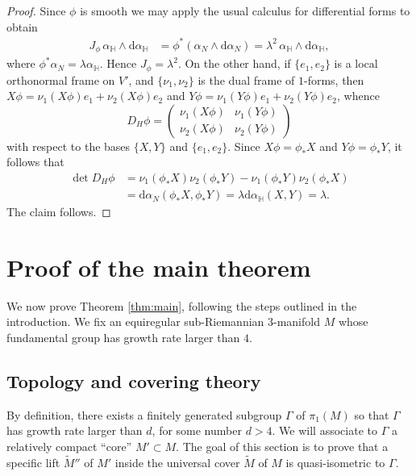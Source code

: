 \documentclass[10pt,letterpaper]{amsart}
\theoremstyle{definition}
\numberwithin{thm}{subsection}
\numberwithin{equation}{section}
\begin{document}
\begin{proof}
Since $\phi$ is smooth we may apply the usual calculus for differential forms to obtain
\begin{align*}
J_{\phi} \, \alpha_{\mathbb H}\wedge \mathrm{d}\alpha_{\mathbb H}&=
\phi^{\ast} (\alpha_N \wedge \mathrm{d}\alpha_N)= \lambda^2 \,
\alpha_{\mathbb H}\wedge \mathrm{d}\alpha_{\mathbb H},
\end{align*}
where $\phi^{\ast}\alpha_N = \lambda \alpha_{\mathbb H}$.
Hence
$
J_\phi = \lambda^2.
$
On the other hand, if $\{e_1,e_2\}$ is a local orthonormal frame on $V'$, and $\{\nu_1,\nu_2\}$ is the dual frame of $1$-forms, then $X\phi= \nu_1(X\phi) e_1 + \nu_2(X\phi) e_2$ and $Y\phi = \nu_1 (Y\phi) e_1 + \nu_2(Y\phi) e_2$, whence
\begin{displaymath}
D_H \phi = \begin{pmatrix} \nu_1(X\phi)& \nu_1(Y\phi)\\ \nu_2(X\phi)&\nu_2(Y\phi) \end{pmatrix}
\end{displaymath}
with respect to the bases $\{X,Y\}$ and $\{e_1,e_2\}$. Since
$
X\phi = \phi_{\ast} X$ and  $Y\phi= \phi_{\ast}Y$,
it follows that
\begin{equation*}\begin{split}
\det D_H \phi
&= \nu_1(\phi_{\ast}X)\nu_2(\phi_{\ast}Y) -\nu_1(\phi_{\ast}Y)\nu_2(\phi_{\ast}X) \\
&=\mathrm{d}\alpha_N(\phi_{\ast}X,\phi_{\ast}Y)
= \lambda \mathrm{d}\alpha_{\mathbb H}(X,Y)
=\lambda.
\end{split}\end{equation*}
The claim follows.
\end{proof}

\section{Proof of the main theorem}\label{s:main}
We now prove Theorem \ref{thm:main}, following the steps outlined in the introduction. We fix an equiregular sub-Riemannian $3$-manifold $M$ whose fundamental group has growth rate larger than $4$.

\subsection{Topology and covering theory}
\label{sec:topology}

By definition, there exists a finitely generated subgroup $\Gamma$ of $\pi_1(M)$ so that $\Gamma$ has growth rate larger than $d$, for some number $d>4$. We will associate to $\Gamma$ a relatively compact ``core'' $M'\subset M$. The goal of this section is to prove that a specific lift $\widetilde{M}''$ of $M'$ inside the universal cover $\widetilde{M}$ of $M$ is quasi-isometric to $\Gamma$.
\end{document}
